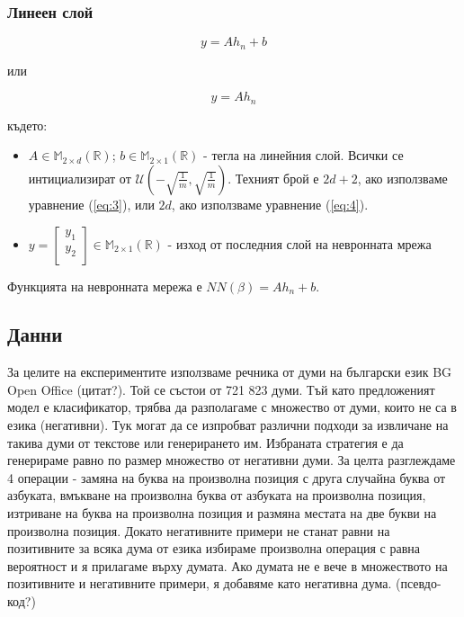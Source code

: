 \documentclass[a4paper,12pt]{article}
\begin{document}
\subsubsection{Линеен слой}

\begin{equation} \label{eq:3}
y = A h_n + b
\end{equation}

или

\begin{equation} \label{eq:4}
y = A h_n
\end{equation}

където:

\begin{itemize}
\item $ A \in \mathbb{M}_{2 \times d} (\mathbb{R})$; $b \in \mathbb{M}_{2 \times 1} (\mathbb{R}) $ - тегла на линейния слой. Всички се интициализират от $\mathcal{U}(-\sqrt{\frac{1}{m}}, \sqrt{\frac{1}{m}})$. Техният брой е $2d + 2$, ако използваме уравнение (\ref{eq:3}), или $2d$, ако използваме уравнение (\ref{eq:4}).
\item $y = \begin{bmatrix}
  y_1 \\ 
  y_2 \\ 
\end{bmatrix} \in \mathbb{M}_{2 \times 1} (\mathbb{R})$ - изход от последния слой на невронната мрежа
\end{itemize}

Функцията на невронната мережа е $NN(\beta) = Ah_n + b$.

\subsection{Данни}

За целите на експериментите използваме речника от думи на български език BG Open Office (цитат?). Той се състои от 721 823 думи. Тъй като предложеният модел е класификатор, трябва да разполагаме с множество от думи, които не са в езика (негативни). Тук могат да се изпробват различни подходи за извличане на такива думи от текстове или генерирането им. Избраната стратегия е да генерираме равно по размер множество от негативни думи. За целта разглеждаме 4 операции - замяна на буква на произволна позиция с друга случайна буква от азбуката, вмъкване на произволна буква от азбуката на произволна позиция, изтриване на буква на произволна позиция и размяна местата на две букви на произволна позиция. Докато негативните примери не станат равни на позитивните за всяка дума от езика избираме произволна операция с равна вероятност и я прилагаме върху думата. Ако думата не е вече в множеството на позитивните и негативните примери, я добавяме като негативна дума. (псевдо-код?)
\end{document}
